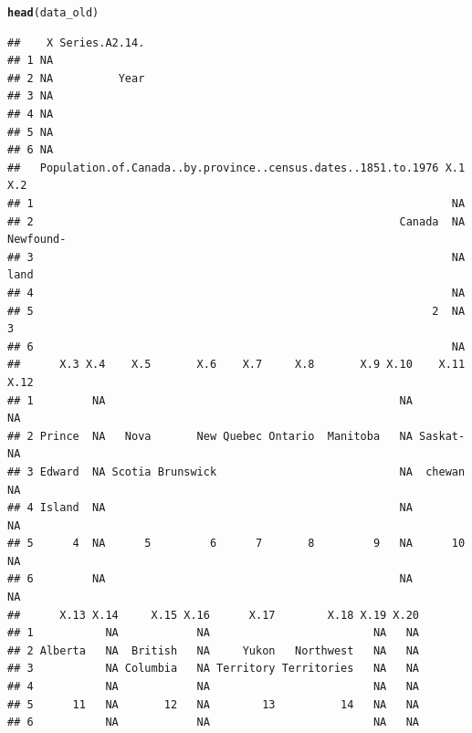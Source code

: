 \documentclass[aspectratio=169]{beamer}\usepackage[]{graphicx}\usepackage[]{xcolor}
\makeatletter
\newcommand{\hldef}[1]{\textcolor[rgb]{0.345,0.345,0.345}{#1}}%
\newcommand{\hlkwd}[1]{\textcolor[rgb]{0.737,0.353,0.396}{\textbf{#1}}}%
\newenvironment{kframe}{%
 \def\at@end@of@kframe{}%
 \ifinner\ifhmode%
  \def\at@end@of@kframe{\end{minipage}}%
  \begin{minipage}{\columnwidth}%
 \fi\fi%
 \def\FrameCommand##1{\hskip\@totalleftmargin \hskip-\fboxsep
 \colorbox{shadecolor}{##1}\hskip-\fboxsep
     \hskip-\linewidth \hskip-\@totalleftmargin \hskip\columnwidth}%
 \MakeFramed {\advance\hsize-\width
   \@totalleftmargin\z@ \linewidth\hsize
   \@setminipage}}%
 {\par\unskip\endMakeFramed%
 \at@end@of@kframe}
\newenvironment{knitrout}{}{} %
\makeatother
\begin{document}
\begin{frame}[fragile]
\begin{knitrout}
\color{fgcolor}\begin{kframe}
\begin{alltt}
\hlkwd{head}\hldef{(data_old)}
\end{alltt}
\begin{verbatim}
##    X Series.A2.14.
## 1 NA              
## 2 NA          Year
## 3 NA              
## 4 NA              
## 5 NA              
## 6 NA              
##   Population.of.Canada..by.province..census.dates..1851.to.1976 X.1       X.2
## 1                                                                NA          
## 2                                                        Canada  NA Newfound-
## 3                                                                NA      land
## 4                                                                NA          
## 5                                                             2  NA         3
## 6                                                                NA          
##      X.3 X.4    X.5       X.6    X.7     X.8       X.9 X.10    X.11 X.12
## 1         NA                                             NA           NA
## 2 Prince  NA   Nova       New Quebec Ontario  Manitoba   NA Saskat-   NA
## 3 Edward  NA Scotia Brunswick                            NA  chewan   NA
## 4 Island  NA                                             NA           NA
## 5      4  NA      5         6      7       8         9   NA      10   NA
## 6         NA                                             NA           NA
##      X.13 X.14     X.15 X.16      X.17        X.18 X.19 X.20
## 1           NA            NA                         NA   NA
## 2 Alberta   NA  British   NA     Yukon   Northwest   NA   NA
## 3           NA Columbia   NA Territory Territories   NA   NA
## 4           NA            NA                         NA   NA
## 5      11   NA       12   NA        13          14   NA   NA
## 6           NA            NA                         NA   NA
\end{verbatim}
\end{kframe}
\end{knitrout}
\end{frame}
\end{document}
